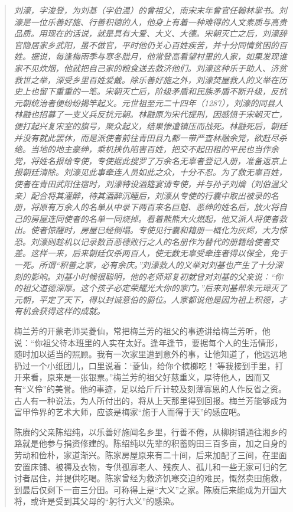 \begin{quotation}\it
    刘濠，字浚登，为刘基（字伯温）的曾祖父，南宋末年曾官任翰林掌书。刘濠是一位乐善好施、行善积德的人，他身上有着一种难得的人文素质与高贵品质。用现在的话说，就是具有大爱、大义、大德。宋朝灭亡之后，刘濠辞官隐居家乡武阳，虽不做官，平时他仍关心百姓疾苦，并十分同情贫困的百姓。据说，每逢梅雨季与寒冬腊月，他常登高看望村里的人家，如果发现谁家不见炊烟，他就把自己家的粮食送去救济他们。刘濠这种乐于助人、济贫救世之举，深受乡里百姓爱戴。除乐善好施之外，刘濠焚屋救人的义举在历史上也留下重重的一笔。宋朝灭亡后，阶级矛盾和民族矛盾不断升级，反抗元朝统治者便纷纷揭竿起义。元世祖至元二十四年（1287），刘濠的同县人林融也招募了一支义兵反抗元朝。林融原为宋代提刑，因感愤于宋朝灭亡，便打起兴复宋室的旗号，聚众起义，结果惨遭镇压而战死。林融死后，朝廷并没有就此罢休，而是派使者前往青田县九都一带严查林融余党，欲赶尽杀绝。当地的地主豪绅，乘机挟仇陷害百姓，把交不起田租的平民也当作余党，将姓名报给专使，专使据此搜罗了万余名无辜者登记入册，准备返京上报朝廷清除。刘濠见此事牵连人员如此之众，十分不忍。为了救无辜百姓，使者在青田武阳住宿时，刘濠特设酒筵宴请专使，并与孙子刘爚（刘伯温父亲）配合将其灌醉，待其酒醉沉睡后，刘濠从专使的行囊中取出被录的名册，将原有万余人的名单从中录下两百来名巨魁、恶绅的姓名后，放火将自己的房屋连同使者的名单一同烧掉。看着熊熊大火燃起，他又派人将使者救出。使者惊醒时，房屋已经倒塌。专使见行囊和籍册一概化为灰烬，大为惊恐。刘濠则趁机以记录数百恶德败行之人的名册作为替代的册籍给使者交差。这样一来，后来朝廷仅杀两百人，使无数无辜受牵连者得以保全，免于一死。所谓“积善之家，必有余庆。”刘濠救人的义举对刘基也产生了十分深刻的影响。刘基小时候很聪明，他的老师郑复初就曾对刘基的父亲说：“你的祖父道德深厚。这个孩子必定荣耀光大你的家门。”后来刘基帮朱元璋灭了元朝，平定了天下，得以封诚意伯的爵位。人家都说他是因为祖上积德，才有机会获得这样的成就。

    梅兰芳的开蒙老师吴菱仙，常把梅兰芳的祖父的事迹讲给梅兰芳听，他说：“你祖父待本班里的人实在太好。逢年逢节，要据每个人的生活情形，随时加以适当的照顾。我有一次家里遭到意外的事，让他知道了，他远远地扔过一个小纸团儿，口里说着：‘菱仙，给你个槟榔吃！’等我接到手里，打开来看，原来是一张银票。”梅兰芳的祖父好慈重义，厚待他人，因而又有“义伶”的美誉。他的事迹，足以给斤斤计较及刻薄寡恩的人作反省之资。古人有一种说法，为人所付出的，将从上天那里得到回报。梅兰芳能够成为富甲伶界的艺术大师，应该是梅家“施于人而得于天”的感应吧。

    陈赓的父亲陈绍纯，以乐善好施闻名乡里，行善不倦，从柳树铺通往湘乡的路就是他参与捐资修建的。陈绍纯以先辈的积蓄购田三百多亩，加之自身的劳动和俭朴，家道渐兴。陈家房屋原来有二十间，后来加配了三间，在里面安置床铺、被褥及衣物，专供孤寡老人、残疾人、孤儿和一些无家可归的乞讨者居住，并提供吃喝。陈家曾经为救济饥寒交迫的难民，慨然卖田施救，到最后仅剩下一亩三分田。可称得上是“大义”之家。陈赓后来能成为开国大将，或许是受到其父母的“躬行大义”的感染。


\end{quotation}
